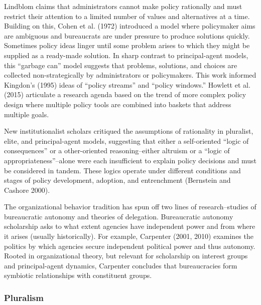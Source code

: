 Lindblom claims that administrators cannot make policy rationally and must restrict their attention to a limited number of values and alternatives at a time. Building on this, Cohen et al. (1972) introduced a model where policymaker aims are ambiguous and bureaucrats are under pressure to produce solutions quickly. Sometimes policy ideas linger until some problem arises to which they might be supplied as a ready-made solution. In sharp contrast to principal-agent models, this ``garbage can'' model suggests that problems, solutions, and choices are collected non-strategically by administrators or policymakers. This work informed Kingdon's (1995) ideas of ``policy streams'' and ``policy windows.'' Howlett et al. (2015) articulate a research agenda based on the trend of more complex policy design where multiple policy tools are combined into baskets that address multiple goals. 

New institutionalist scholars critiqued the assumptions of rationality in pluralist, elite, and principal-agent models, suggesting that either a self-oriented ``logic of consequences'' or a other-oriented reasoning--either altruism or a ``logic of appropriateness''--alone were each insufficient to explain policy decisions and must be considered in tandem. These logics operate under different conditions and stages of policy development, adoption, and entrenchment (Bernstein and Cashore 2000).  

The organizational behavior tradition has spun off two lines of research--studies of bureaucratic autonomy and theories of delegation. Bureaucratic autonomy scholarship asks to what extent agencies have independent power and from where it arises (usually historically). For example, Carpenter (2001, 2010) examines the politics by which agencies secure independent political power and thus autonomy. Rooted in organizational theory, but relevant for scholarship on interest groups and principal-agent dynamics, Carpenter concludes that bureaucracies form symbiotic relationships with constituent groups. %

\subsubsection{Pluralism}

